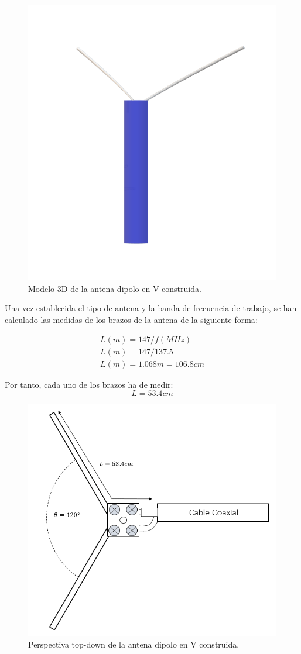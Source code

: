 \documentclass[a4paper,openright,12pt]{article}
\begin{document}
\begin{figure}[H]
    \centering
    \includegraphics[width=0.45\linewidth]{imagenes/ModeloAntena.png}
    \caption{Modelo 3D de la antena dipolo en V construida.}
    \label{fig:modelo3D}
\end{figure}



Una vez establecida el tipo de antena y la banda de frecuencia de trabajo, se han calculado las medidas de los brazos de la antena de la siguiente forma:

\begin{gather}
        L(m) = 147/f(MHz) \\
       L(m) = 147/137.5 \\
       L(m) = 1.068m = 106.8cm
\end{gather}

Por tanto, cada uno de los brazos ha de medir: 
\begin{equation*}
    L = 53.4cm
\end{equation*}

\begin{figure}[H]
    \centering
    \includegraphics[width=0.5\linewidth]{imagenes/PerspectivaTopDown.png}
    \caption{Perspectiva top-down de la antena dipolo en V construida.}
    \label{fig:topdown}
\end{figure}
\end{document}
